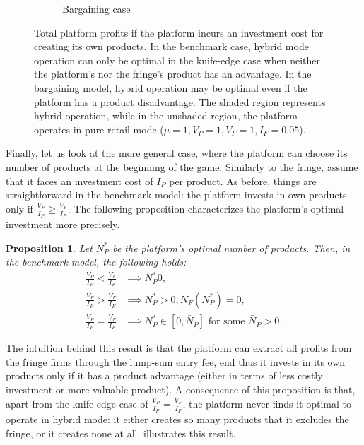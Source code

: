 \documentclass[a4paper]{article}
\newtheorem{proposition}{Proposition}
\begin{document}
\begin{figure}
\begin{subfigure}[b]{0.45\textwidth}
        \caption{Bargaining case}
        \label{fig:optimal_n_p_bargaining}
    \end{subfigure}
    \caption{Total platform profits if the platform incurs an investment cost for creating its own products. In the benchmark case, hybrid mode operation can only be optimal in the knife-edge case when neither the platform's nor the fringe's product has an advantage. In the bargaining model, hybrid operation may be optimal even if the platform has a product disadvantage. The shaded region represents hybrid operation, while in the unshaded region, the platform operates in pure retail mode ($\mu = 1, V_P = 1, V_F = 1, I_F = 0.05$).}
    \label{fig:optimal_n_p}
\end{figure}


Finally, let us look at the more general case, where the platform can choose its number of products at the beginning of the game.
Similarly to the fringe, assume that it faces an investment cost of $I_P$ per product.
As before, things are straightforward in the benchmark model: the platform invests in own products only if $\frac{V_P}{I_P} \geq \frac{V_F}{I_F}$.
The following proposition characterizes the platform's optimal investment more precisely.
\begin{proposition}
    \label{prop:optimal_n_p_benchmark}
    Let $N_P^*$ be the platform's optimal number of products.
    Then, in the benchmark model, the following holds:
    \begin{align*}
        \frac{V_P}{I_P} < \frac{V_F}{I_F} &\implies N_P^* 0, \\
        \frac{V_P}{I_P} > \frac{V_F}{I_F} &\implies N_P^* > 0, N_F(N_P^*) = 0, \\
        \frac{V_P}{I_P} = \frac{V_F}{I_F} &\implies N_P^* \in [0, \bar{N}_P] \text{ for some } \bar{N}_P > 0.
    \end{align*}
\end{proposition}

The intuition behind this result is that the platform can extract all profits from the fringe firms through the lump-sum entry fee, end thus it invests in its own products only if it has a product advantage (either in terms of less costly investment or more valuable product).
A consequence of this proposition is that, apart from the knife-edge case of $\frac{V_P}{I_P} = \frac{V_F}{I_F}$, the platform never finds it optimal to operate in hybrid mode: it either creates so many products that it excludes the fringe, or it creates none at all.
 illustrates this result.
\end{document}
